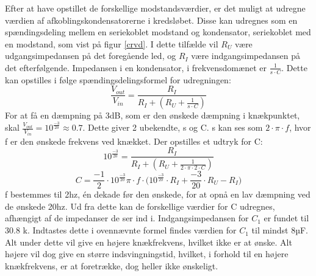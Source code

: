 Efter at have opstillet de forskellige modstandsværdier, er det muligt at udregne værdien af afkoblingskondensatorerne i kredsløbet. Disse kan udregnes som en spændingsdeling mellem en seriekoblet modstand og kondensator, seriekoblet med en modstand, som vist på figur \ref{crvd}. I dette tilfælde vil $R_U$ være udgangsimpedansen på det foregående led, og $R_I$ være indgangsimpedansen på det efterfølgende. Impedansen i en kondensator, i frekvensdomænet er $\frac{1}{s\cdot C}$. Dette kan opstilles i følge spændingsdelingsformel for udregningen:
\begin{equation}
\frac{V_{out}}{V_{in}}=\frac{R_I}{R_I+(R_U+\frac{1}{s\cdot C})}
\end{equation}
For at få en dæmpning på 3dB, som er den ønskede dæmpning i knækpunktet, skal $\frac{V_{out}}{V_{in}}=10^{\frac{-3}{20}}\approx0.7$. 
Dette giver 2 ubekendte, s og C. s kan ses som $2\cdot \pi \cdot f$, hvor f er den ønskede frekvens ved knækket. Der opstilles et udtryk for C:
\begin{equation}
10^{\frac{-3}{20}}=\frac{R_I}{R_I+(R_U+\frac{1}{2\cdot\pi\cdot 2\cdot C})}
\end{equation}
\begin{equation}
C=\frac{-1}{2}\cdot{10^{\frac{-3}{20}}}{\pi\cdot f\cdot(10^{\frac{-3}{20}}\cdot R_I+\frac{-3}{20}}\cdot R_U - R_I)
\end{equation}
f bestemmes til 2hz, én dekade før den ønskede, for at opnå en lav dæmpning ved de ønskede 20hz. Ud fra dette kan de forskellige værdier for C udregnes, afhængigt af de impedanser de ser ind i.
Indgangsimpedansen for $C_1$ er fundet til 30.8 k\ohm . Indtastes dette i ovennævnte formel findes værdien for $C_1$ til mindst 8µF. Alt under dette vil give en højere knækfrekvens, hvilket ikke er at ønske. Alt højere vil dog give en større indsvingningstid, hvilket, i forhold til en højere knækfrekvens, er at foretrække, dog heller ikke ønskeligt.
